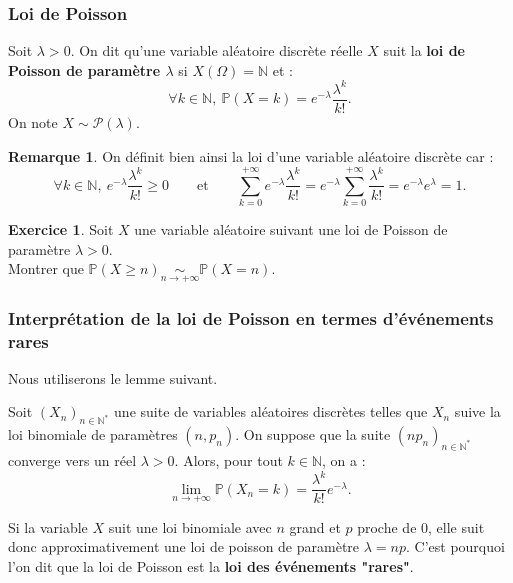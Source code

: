 \documentclass[french]{article}
\renewcommand{\P}{\mathbb{P}}
\newcommand{\N}{\mathbb{N}}
\newcommand{\st}{^*}
\theoremstyle{plain}
\theoremstyle{definition}
\newtheorem{exo}{Exercice}
\newtheorem*{rmq}{Remarque}
\theoremstyle{remark}
\begin{document}
\subsubsection*{Loi de Poisson}

\begin{dfn}
	Soit $\lambda>0$. On dit qu'une variable aléatoire discrète réelle $X$ suit la \textbf{loi de Poisson de paramètre $\lambda$} si $X(\Omega)=\N$ et :
	$$\forall k\in\N,\ \P(X=k)=e^{-\lambda}\frac{\lambda^k}{k!}.$$
	On note $X\sim\mathcal{P}(\lambda)$.
\end{dfn}

\begin{rmq}
	On définit bien ainsi la loi d'une variable aléatoire discrète car :
	$$\forall k\in\N,\ e^{-\lambda}\frac{\lambda^k}{k!}\geqslant0\quad\quad\text{et}\quad\quad\sum_{k=0}^{+\infty}e^{-\lambda}\frac{\lambda^k}{k!}=e^{-\lambda}\sum_{k=0}^{+\infty}\frac{\lambda^k}{k!}=e^{-\lambda}e^{\lambda}=1.$$
\end{rmq}

\begin{exo}
	Soit $X$ une variable aléatoire suivant une loi de Poisson de paramètre $\lambda>0$.\\
	Montrer que $\P(X\geqslant n)\underset{n\to+\infty}{\sim}\P(X=n)$.
\end{exo}

\subsubsection*{Interprétation de la loi de Poisson en termes d'événements rares}

Nous utiliserons le lemme suivant.

\begin{thm}{}%
	Soit $(X_n)_{n\in\N\st}$ une suite de variables aléatoires discrètes telles que $X_n$ suive la loi binomiale de paramètres $(n,p_n)$. On suppose que la suite $(np_n)_{n\in\N\st}$ converge vers un réel $\lambda>0$. Alors, pour tout $k\in\N$, on a : $$\underset{n\to+\infty}{\lim}\P(X_n=k)=\frac{\lambda^k}{k!}e^{-\lambda}.$$
\end{thm}

Si la variable $X$ suit une loi binomiale avec $n$ grand et $p$ proche de $0$, elle suit donc approximativement une loi de poisson de paramètre $\lambda=np$. C'est pourquoi l'on dit que la loi de Poisson est la \textbf{loi des événements "rares"}.
\end{document}
